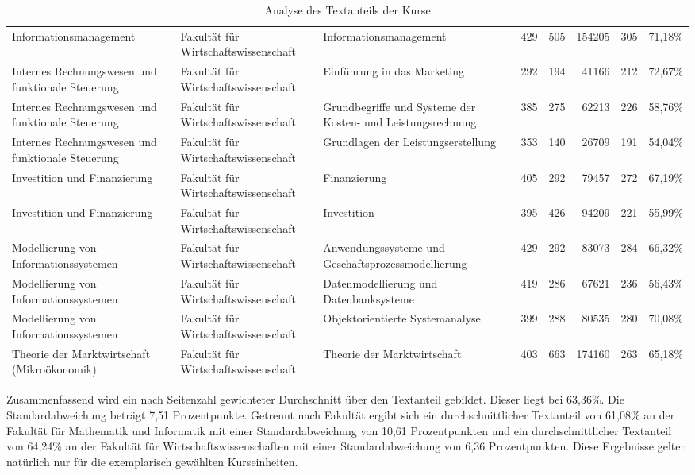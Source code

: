 \begin{sidewaystable}
{\begin{tabular}{lllrrrrr}
Informationsmanagement & Fakultät für Wirtschaftswissenschaft & Informationsmanagement & 429 & 505 & 154205 & 305 & 71,18\%\\
Internes Rechnungswesen und funktionale Steuerung & Fakultät für Wirtschaftswissenschaft & Einführung in das Marketing & 292 & 194 & 41166 & 212 & 72,67\%\\
Internes Rechnungswesen und funktionale Steuerung & Fakultät für Wirtschaftswissenschaft & Grundbegriffe und Systeme der Kosten- und Leistungsrechnung & 385 & 275 & 62213 & 226 & 58,76\%\\
Internes Rechnungswesen und funktionale Steuerung & Fakultät für Wirtschaftswissenschaft & Grundlagen der Leistungserstellung & 353 & 140 & 26709 & 191 & 54,04\%\\
Investition und Finanzierung & Fakultät für Wirtschaftswissenschaft & Finanzierung & 405 & 292 & 79457 &  272 & 67,19\%\\
Investition und Finanzierung & Fakultät für Wirtschaftswissenschaft & Investition & 395 & 426 & 94209 & 221 & 55,99\%\\
Modellierung von Informationssystemen & Fakultät für Wirtschaftswissenschaft & Anwendungssysteme und Geschäftsprozessmodellierung & 429 & 292 & 83073 & 284 & 66,32\%\\
Modellierung von Informationssystemen & Fakultät für Wirtschaftswissenschaft & Datenmodellierung und Datenbanksysteme & 419 & 286 & 67621 & 236 & 56,43\%\\
Modellierung von Informationssystemen & Fakultät für Wirtschaftswissenschaft & Objektorientierte Systemanalyse & 399 & 288 & 80535 & 280 & 70,08\%\\
Theorie der Marktwirtschaft (Mikroökonomik) & Fakultät für Wirtschaftswissenschaft & Theorie der Marktwirtschaft & 403 & 663 & 174160 & 263 & 65,18\%\\
\end{tabular}}
\caption{Analyse des Textanteils der Kurse}
\label{tab:AnalyseDesTextanteilsDerKurse}
\end{sidewaystable}


Zusammenfassend wird ein nach Seitenzahl gewichteter Durchschnitt über den Textanteil gebildet. Dieser liegt bei 63,36\%. Die Standardabweichung beträgt 7,51 Prozentpunkte. Getrennt nach Fakultät ergibt sich ein durchschnittlicher Textanteil von 61,08\% an der Fakultät für Mathematik und Informatik mit einer Standardabweichung von 10,61 Prozentpunkten und ein durchschnittlicher Textanteil von 64,24\% an der Fakultät für Wirtschaftswissenschaften mit einer Standardabweichung von 6,36 Prozentpunkten. Diese Ergebnisse gelten natürlich nur für die exemplarisch gewählten Kurseinheiten.

